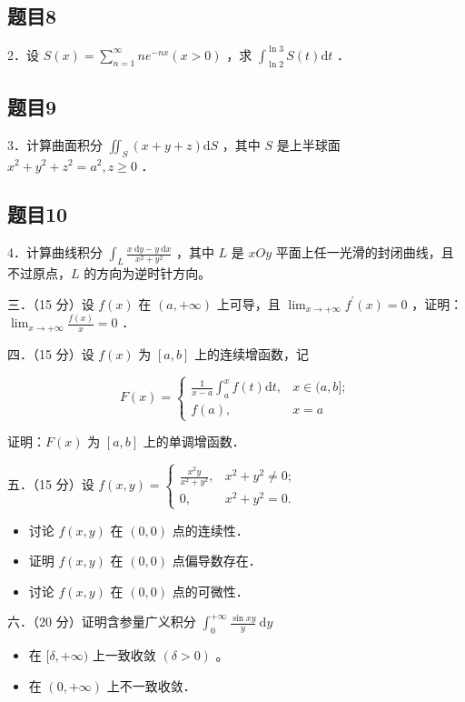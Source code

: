 \documentclass{article}
\begin{document}
\subsection{题目8}
2．设 \(S(x)=\sum_{n=1}^{\infty} n e^{-n x}(x>0)\) ，求 \(\int_{\ln 2}^{\ln 3} S(t) \mathrm{d} t\) ．

\subsection{题目9}
3．计算曲面积分 \(\iint_{S}(x+y+z) \mathrm{d} S\) ，其中 \(S\) 是上半球面 \(x^{2}+y^{2}+z^{2}=a^{2}, z \geq 0\) ．

\subsection{题目10}
4．计算曲线积分 \(\int_{L} \frac{x \mathrm{~d} y-y \mathrm{~d} x}{x^{2}+y^{2}}\) ，其中 \(L\) 是 \(x O y\) 平面上任一光滑的封闭曲线，且不过原点，\(L\) 的方向为逆时针方向。

三．（15 分）设 \(f(x)\) 在 \((a,+\infty)\) 上可导，且 \(\lim _{x \rightarrow+\infty} f^{\prime}(x)=0\) ，证明： \(\lim _{x \rightarrow+\infty} \frac{f(x)}{x}=0\) ．

四．（15 分）设 \(f(x)\) 为 \([a, b]\) 上的连续增函数，记

\[
F(x)= \begin{cases}\frac{1}{x-a} \int_{a}^{x} f(t) \mathrm{d} t, & x \in(a, b] ; \\ f(a), & x=a\end{cases}
\]

证明：\(F(x)\) 为 \([a, b]\) 上的单调增函数．

五．（15 分）设 \(f(x, y)= \begin{cases}\frac{x^{2} y}{x^{2}+y^{2}}, & x^{2}+y^{2} \neq 0 ; \\ 0, & x^{2}+y^{2}=0 .\end{cases}\)

\begin{itemize}
  \item[（1）] 讨论 \(f(x, y)\) 在 \((0,0)\) 点的连续性．
  \item[（2）] 证明 \(f(x, y)\) 在 \((0,0)\) 点偏导数存在．
  \item[（3）] 讨论 \(f(x, y)\) 在 \((0,0)\) 点的可微性．
\end{itemize}

六．（20 分）证明含参量广义积分 \(\int_{0}^{+\infty} \frac{\sin x y}{y} \mathrm{~d} y\)

\begin{itemize}
  \item[（1）] 在 \([\delta,+\infty)\) 上一致收敛 \((\delta>0)\) 。
  \item[（2）] 在 \((0,+\infty)\) 上不一致收敛．
\end{itemize}
\end{document}
